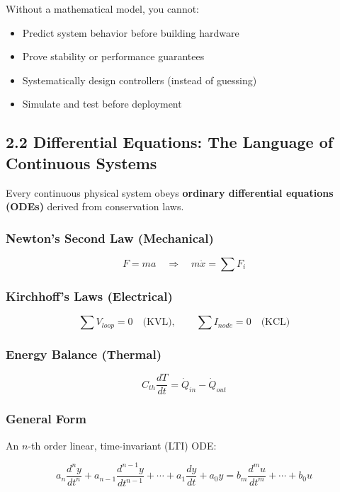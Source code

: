 \documentclass[11pt,a4paper]{book}
\begin{document}
Without a mathematical model, you cannot:
\begin{itemize}
\item Predict system behavior before building hardware
\item Prove stability or performance guarantees
\item Systematically design controllers (instead of guessing)
\item Simulate and test before deployment
\end{itemize}

\medskip\noindent\hrulefill\medskip

\subsection{2.2 Differential Equations: The Language of Continuous Systems}

Every continuous physical system obeys \textbf{ordinary differential equations (ODEs)} derived from conservation laws.

\subsubsection{Newton's Second Law (Mechanical)}

\[F = ma \quad \Rightarrow \quad m\ddot{x} = \sum F_i\]

\subsubsection{Kirchhoff's Laws (Electrical)}

\[\sum V_{loop} = 0 \quad \text{(KVL)}, \qquad \sum I_{node} = 0 \quad \text{(KCL)}\]

\subsubsection{Energy Balance (Thermal)}

\[C_{th} \frac{dT}{dt} = \dot{Q}_{in} - \dot{Q}_{out}\]

\subsubsection{General Form}

An $n$-th order linear, time-invariant (LTI) ODE:

\[a_n \frac{d^n y}{dt^n} + a_{n-1} \frac{d^{n-1} y}{dt^{n-1}} + \cdots + a_1 \frac{dy}{dt} + a_0 y = b_m \frac{d^m u}{dt^m} + \cdots + b_0 u\]
\end{document}
